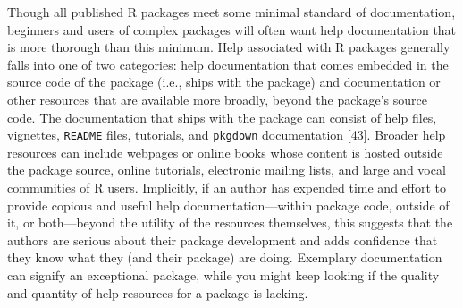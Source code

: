 \documentclass[10pt,letterpaper]{article}
\begin{document}
Though all published R packages meet some minimal standard of
documentation, beginners and users of complex packages will often want
help documentation that is more thorough than this minimum. Help
associated with R packages generally falls into one of two categories:
help documentation that comes embedded in the source code of the package
(i.e., ships with the package) and documentation or other resources that
are available more broadly, beyond the package's source code. The
documentation that ships with the package can consist of help files,
vignettes, \texttt{README} files, tutorials, and \texttt{pkgdown}
documentation {[}43{]}. Broader help resources can include webpages or
online books whose content is hosted outside the package source, online
tutorials, electronic mailing lists, and large and vocal communities of
R users. Implicitly, if an author has expended time and effort to
provide copious and useful help documentation---within package code,
outside of it, or both---beyond the utility of the resources themselves,
this suggests that the authors are serious about their package
development and adds confidence that they know what they (and their
package) are doing. Exemplary documentation can signify an exceptional
package, while you might keep looking if the quality and quantity of
help resources for a package is lacking.
\end{document}
